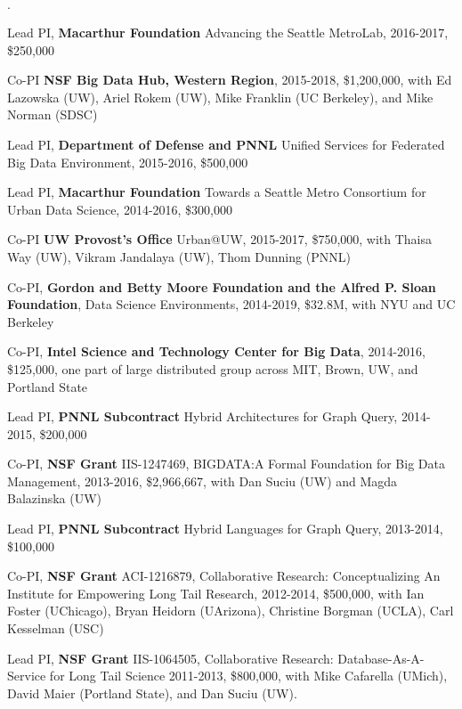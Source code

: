 \documentclass[10pt]{article}
\newenvironment{bulletlist}
   {
      \begin{list}
         {$\cdot$}
         {
            \setlength{\itemsep}{.7ex}
            \setlength{\parsep}{0ex}
            \setlength{\leftmargin}{0.7em}
            \setlength{\parskip}{0ex}
            \setlength{\topsep}{0ex}
         }
   }
   {
      \end{list}
   }
\newcommand{\marginlabel}[1]{
\begin{minipage}[b]{0.8\labelwidth}{\large \textsf{\textbf{#1}}}\end{minipage}}
\newcommand{\entrylabel}[1]{\mbox{\marginlabel{#1}}\hfill}
\newcommand{\MainListlabel}[1]
   {
      \parbox[t]{\labelwidth}{\hspace{.8em}\marginlabel{#1}}
   }
\newenvironment{MainList}[1]
   {
      \renewcommand{\entrylabel}{\MainListlabel}
      \begin{list}{}
      {
         \renewcommand{\makelabel}{\entrylabel}
         \setlength   {\itemindent}{-.65em}
         \setlength   {\labelwidth}{#1}
         \setlength   {\leftmargin}{\labelwidth}
         \setlength   {\itemsep}{3ex}
      }
   }
   {
      \end{list}
   }
\begin{document}
\begin{MainList}{88pt}
\begin{bulletlist}
\item Lead PI, {\bf Macarthur Foundation} Advancing  the Seattle MetroLab, 2016-2017, \$250,000

\item Co-PI {\bf NSF Big Data Hub, Western Region}, 2015-2018, \$1,200,000, with Ed Lazowska (UW), Ariel Rokem (UW), Mike Franklin (UC Berkeley), and Mike Norman (SDSC)

\item Lead PI, {\bf Department of Defense and PNNL} Unified Services for Federated Big Data Environment, 2015-2016, \$500,000

\item Lead PI, {\bf Macarthur Foundation} Towards a Seattle Metro Consortium for Urban Data Science, 2014-2016, \$300,000

\item Co-PI {\bf UW Provost's Office} Urban@UW, 2015-2017, \$750,000, with Thaisa Way (UW), Vikram Jandalaya (UW), Thom Dunning (PNNL)

\item Co-PI, {\bf Gordon and Betty Moore Foundation and the Alfred P. Sloan Foundation}, Data Science Environments, 2014-2019, \$32.8M, with NYU and UC Berkeley

\item Co-PI, {\bf Intel Science and Technology Center for Big Data}, 2014-2016, \$125,000, one part of large distributed group across MIT, Brown, UW, and Portland State

\item Lead PI, {\bf PNNL Subcontract} Hybrid Architectures for Graph Query, 2014-2015, \$200,000

\item Co-PI, {\bf NSF Grant} IIS-1247469, BIGDATA:A Formal Foundation for Big Data Management, 2013-2016, \$2,966,667, with Dan Suciu (UW) and Magda Balazinska (UW)

\item Lead PI, {\bf PNNL Subcontract} Hybrid Languages for Graph Query, 2013-2014, \$100,000

\item Co-PI, {\bf NSF Grant} ACI-1216879, Collaborative Research: Conceptualizing An Institute for Empowering Long Tail Research, 2012-2014, \$500,000, with Ian Foster (UChicago), Bryan Heidorn (UArizona), Christine Borgman (UCLA), Carl Kesselman (USC)

\item Lead PI, {\bf NSF Grant} IIS-1064505, Collaborative Research: Database-As-A-Service for Long Tail Science
2011-2013, \$800,000, with Mike Cafarella (UMich), David Maier (Portland State), and Dan Suciu (UW).


\end{bulletlist}
\end{MainList}
\end{document}
